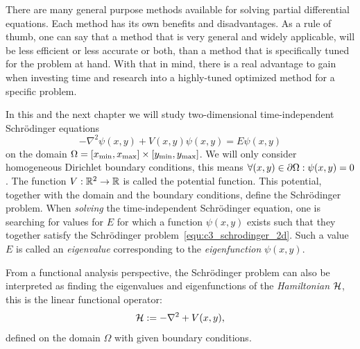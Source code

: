 


\label{cha:c3}

There are many general purpose methods available for solving partial differential equations. Each method has its own benefits and disadvantages. As a rule of thumb, one can say that a method that is very general and widely applicable, will be less efficient or less accurate or both, than a method that is specifically tuned for the problem at hand. With that in mind, there is a real advantage to gain when investing time and research into a highly-tuned optimized method for a specific problem.

In this and the next chapter we will study two-dimensional time-independent Schrödinger equations
\begin{equation}\label{equ:c3_schrodinger_2d}
  -\nabla^2\psi(x, y) + V(x, y) \psi(x, y) = E \psi(x, y)
\end{equation}
on the domain $\Omega = [{x_{\text{min}}}, {x_{\text{max}}}]\times[{y_{\text{min}}}, {y_{\text{max}}}]$. We will only consider homogeneous Dirichlet boundary conditions, this means $\forall (x, y) \in \partial\Omega : \psi(x, y) = 0$. The function $V: \mathbb{R}^2 \to \mathbb{R}$ is called the potential function. This potential, together with the domain and the boundary conditions, define the Schrödinger problem. When \emph{solving} the time-independent Schrödinger equation, one is searching for values for $E$ for which a function $\psi(x, y)$  exists such that they together satisfy the Schrödinger problem~\eqref{equ:c3_schrodinger_2d}. Such a value $E$ is called an \emph{eigenvalue} corresponding to the \emph{eigenfunction} $\psi(x, y)$.

From a functional analysis perspective, the Schrödinger problem can also be interpreted as finding the eigenvalues and eigenfunctions of the \emph{Hamiltonian} $\mathcal{H}$, this is the linear functional operator:
$$
  \mathcal{H} := -\nabla^2 + V(x, y)\text{,}
$$
defined on the domain $\Omega$ with given boundary conditions.

